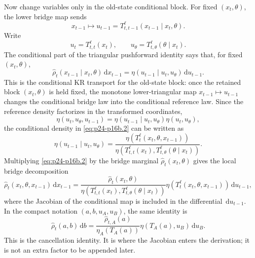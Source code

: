 \documentclass[11pt]{article}
\numberwithin{equation}{section}
\newcommand{\dd}{\,\mathrm d}
\begin{document}
Now change variables only in the old-state conditional block.  For fixed
\((x_t,\theta)\), the lower bridge map sends
\begin{equation}
    x_{t-1}
    \mapsto
    u_{t-1}
    =
    T_{t,t-1}^{\ell}(x_{t-1}\mid x_t,\theta).
    \label{eq:p24-p16b}
\end{equation}
Write
\begin{equation}
    u_t=T_{t,t}^{\ell}(x_t),\qquad
    u_\theta=T_{t,\theta}^{\ell}(\theta\mid x_t).
    \label{eq:p24-p16b.1}
\end{equation}
The conditional part of the triangular pushforward identity says that, for
fixed \((x_t,\theta)\),
\begin{equation}
    \widehat\rho_t(x_{t-1}\mid x_t,\theta)\dd x_{t-1}
    =
    \eta(u_{t-1}\mid u_t,u_\theta)\dd u_{t-1}.
    \label{eq:p24-p16b.2}
\end{equation}
This is the conditional KR transport for the old-state block: once the retained
block \((x_t,\theta)\) is held fixed, the monotone lower-triangular map
\(x_{t-1}\mapsto u_{t-1}\) changes the conditional bridge law into the
conditional reference law.
Since the reference density factorizes in the transformed coordinates,
\begin{equation}
    \eta(u_t,u_\theta,u_{t-1})
    =
    \eta(u_{t-1}\mid u_t,u_\theta)\eta(u_t,u_\theta),
    \label{eq:p24-p16b.3}
\end{equation}
the conditional density in \eqref{eq:p24-p16b.2} can be written as
\begin{equation}
    \eta(u_{t-1}\mid u_t,u_\theta)
    =
    \frac{\eta(T_t^\ell(x_t,\theta,x_{t-1}))}
    {\eta(T_{t,t}^{\ell}(x_t),T_{t,\theta}^{\ell}(\theta\mid x_t))}.
    \label{eq:p24-p16b.4}
\end{equation}
Multiplying \eqref{eq:p24-p16b.2} by the bridge marginal
\(\widehat\rho_t(x_t,\theta)\) gives the local bridge decomposition
\begin{equation}
    \widehat\rho_t(x_t,\theta,x_{t-1})\dd x_{t-1}
    =
    \frac{
    \widehat\rho_t(x_t,\theta)}
    {\eta(T_{t,t}^{\ell}(x_t),T_{t,\theta}^{\ell}(\theta\mid x_t))}
    \eta(T_t^\ell(x_t,\theta,x_{t-1}))\dd u_{t-1},
    \label{eq:p24-p16c}
\end{equation}
where the Jacobian of the conditional map is included in the differential
\(\dd u_{t-1}\).  In the compact notation \((a,b,u_A,u_B)\), the same identity is
\begin{equation}
    \widehat\rho_t(a,b)\dd b
    =
    \frac{\widehat\rho_{t,A}(a)}
    {\eta_A(T_A(a))}
    \eta(T_A(a),u_B)\dd u_B.
    \label{eq:p30-c2-7}
\end{equation}
This is the cancellation identity.  It is where the Jacobian enters the
derivation; it is not an extra factor to be appended later.
\end{document}
